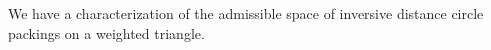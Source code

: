 \documentclass[12pt]{amsart}
\begin{document}
%
%


We have a characterization of
the admissible space of inversive distance circle packings on a weighted triangle.
	
\end{document}
